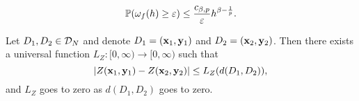 \documentclass[12pt]{report}
\begin{document}
\begin{proposition}
    \begin{equation}
        \mathbb{P}(\omega_f(h) \ge \varepsilon) \le \frac{c_{\beta, p}}{\varepsilon} h^{\beta - \frac{1}{p}}.
    \end{equation}
\end{proposition}


\begin{proposition} \label{prop:Lipschitzness_Z}
    Let $D_1, D_2 \in \mathcal{D}_N$ and denote $D_1 = (\mathbf{x}_1, \mathbf{y}_1)$ and $D_2 = (\mathbf{x}_2, \mathbf{y}_2)$.
    Then there exists a universal function $L_Z\colon[0,\infty)\to[0,\infty)$ such that
    \begin{equation}
        \lvert Z(\mathbf{x}_1, \mathbf{y}_1) - Z(\mathbf{x}_2, \mathbf{y}_2)\rvert
        \le L_Z(d(D_1, D_2)),
    \end{equation}
    and $L_Z$ goes to zero as $d(D_1, D_2)$ goes to zero.
\end{proposition}
\end{document}
